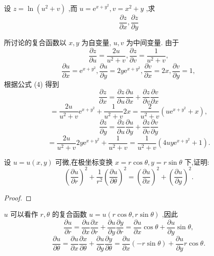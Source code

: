 \begin{example}

\end{example}
设 \(z = \ln \left( {{u}^{2} + v}\right)\) ,而 \(u = {\mathrm{e}}^{x + {y}^{2}},v = {x}^{2} + y\) ,求
\[
\frac{\partial z}{\partial x},\frac{\partial z}{\partial y}
\]
\begin{solution}

\end{solution}
所讨论的复合函数以 \(x,y\) 为自变量, \(u,v\) 为中间变量. 由于
\[
\frac{\partial z}{\partial u} = \frac{2u}{{u}^{2} + v},\frac{\partial z}{\partial v} = \frac{1}{{u}^{2} + v},
\]
\[
\frac{\partial u}{\partial x} = {\mathrm{e}}^{x + {y}^{2}},\frac{\partial u}{\partial y} = {2y}{\mathrm{e}}^{x + {y}^{2}},\frac{\partial v}{\partial x} = {2x},\frac{\partial v}{\partial y} = 1,
\]
根据公式 (4) 得到
\[
\frac{\partial z}{\partial x} = \frac{\partial z}{\partial u}\frac{\partial u}{\partial x} + \frac{\partial z}{\partial v}\frac{\partial v}{\partial x}
\]
\[
= \frac{2u}{{u}^{2} + v}{\mathrm{e}}^{x + {y}^{2}} + \frac{1}{{u}^{2} + v}{2x} = \frac{2}{{u}^{2} + v}\left( {u{\mathrm{e}}^{x + {y}^{2}} + x}\right) ,
\]
\[
\frac{\partial z}{\partial y} = \frac{\partial z}{\partial u}\frac{\partial u}{\partial y} + \frac{\partial z}{\partial v}\frac{\partial v}{\partial y}
\]
\[
= \frac{2u}{{u}^{2} + v}{2y}{\mathrm{e}}^{x + {y}^{2}} + \frac{1}{{u}^{2} + v} = \frac{1}{{u}^{2} + v}\left( {{4uy}{\mathrm{e}}^{x + {y}^{2}} + 1}\right) .
\]
\begin{example}

\end{example}
设 \(u = u\left( {x,y}\right)\) 可微,在极坐标变换 \(x = r\cos \theta ,y = r\sin \theta\) 下,证明:
\[
{\left( \frac{\partial u}{\partial r}\right) }^{2} + \frac{1}{{r}^{2}}{\left( \frac{\partial u}{\partial \theta }\right) }^{2} = {\left( \frac{\partial u}{\partial x}\right) }^{2} + {\left( \frac{\partial u}{\partial y}\right) }^{2}.
\]
\begin{proof}

\end{proof}
\(u\) 可以看作 \(r,\theta\) 的复合函数 \(u = u\left( {r\cos \theta ,r\sin \theta }\right)\) ,因此
\[
\frac{\partial u}{\partial r} = \frac{\partial u}{\partial x}\frac{\partial x}{\partial r} + \frac{\partial u}{\partial y}\frac{\partial y}{\partial r} = \frac{\partial u}{\partial x}\cos \theta  + \frac{\partial u}{\partial y}\sin \theta ,
\]
\[
\frac{\partial u}{\partial \theta } = \frac{\partial u}{\partial x}\frac{\partial x}{\partial \theta } + \frac{\partial u}{\partial y}\frac{\partial y}{\partial \theta } = \frac{\partial u}{\partial x}\left( {-r\sin \theta }\right)  + \frac{\partial u}{\partial y}r\cos \theta .
\]
